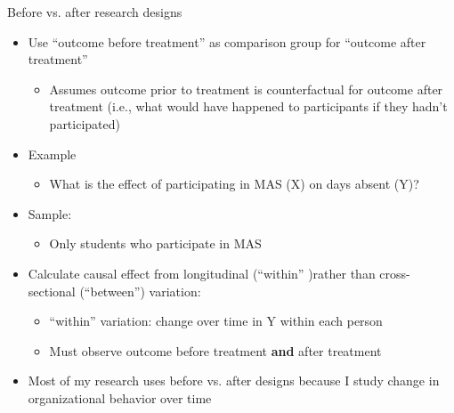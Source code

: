 %
\begin{frame}[shrink=10]{Before vs. after research designs}

	\begin{itemize}
		\item Use ``outcome before treatment'' as comparison group for ``outcome after treatment''
		\begin{itemize}
		\item Assumes outcome prior to treatment is counterfactual for outcome after treatment (i.e., what would have happened to participants if they hadn't participated)
		\end{itemize}
		\vspace{2mm}
		\item Example
			\begin{itemize}
			\item What is the effect of participating in MAS (X) on days absent (Y)?
			\end{itemize}
		\item Sample:
			\begin{itemize}
			\item Only students who participate in MAS
			\end{itemize}	
		\item Calculate causal effect from longitudinal (``within'' )rather than cross-sectional (``between'') variation:
			\begin{itemize}
				\item ``within'' variation: change over time in Y within each person
				\item Must observe outcome before treatment \textbf{and} after treatment
			\end{itemize}
			
		\vspace{2mm}			
		\item Most of my research uses before vs. after designs because I study change in organizational behavior over time
	\end{itemize}		
\end{frame}



